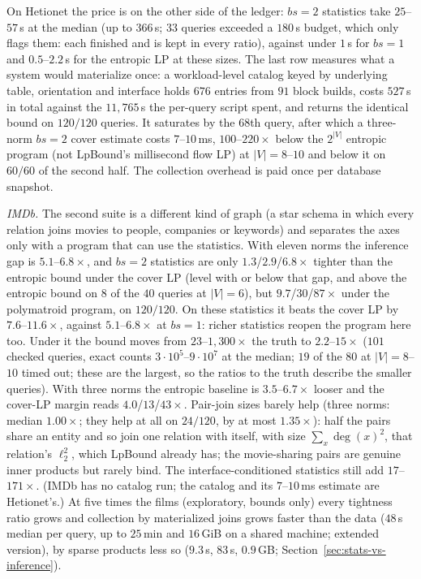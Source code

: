 \documentclass[sigconf, nonacm, acmthm=false]{acmart}
\begin{document}
On Hetionet the
price is on the other side of the ledger: $bs{=}2$ statistics take $25$--$57$\,s at the median (up to
$366$\,s; $33$ queries exceeded a $180$\,s budget, which only flags them:
each finished and is kept in every ratio), against under $1$\,s for $bs{=}1$ and $0.5$--$2.2$\,s for the
entropic LP at these sizes. The last row measures what a system would materialize once: a workload-level catalog keyed by underlying
table, orientation and interface holds $676$ entries from $91$ block
builds, costs $527$\,s in total against the $11{,}765$\,s the per-query
script spent, and returns the identical bound on $120/120$ queries. It
saturates by the $68$th query, after which a three-norm $bs{=}2$ cover estimate costs $7$--$10$\,ms, $100$--$220\times$ below the $2^{|V|}$ entropic program (not LpBound's millisecond flow LP)
at $|V|{=}8$--$10$ and below it on $60/60$ of the second half. The
collection overhead is paid once per database snapshot.

\emph{IMDb.} The second suite is a different kind of graph (a star
schema in which every relation joins movies to people, companies or
keywords) and separates the axes only with a program that can use the
statistics. With eleven norms the inference gap is $5.1$--$6.8\times$, and
$bs{=}2$ statistics are only $1.3$/$2.9$/$6.8\times$ tighter than the
entropic bound under the cover LP (level with or below that gap, and
above the entropic bound on $8$ of the $40$ queries at $|V|{=}6$), but
$9.7$/$30$/$87\times$ under the polymatroid program, on $120/120$. On
these statistics it beats the cover LP by $7.6$--$11.6\times$, against
$5.1$--$6.8\times$ at $bs{=}1$: richer statistics reopen the program here
too. Under it the bound moves from $23$--$1{,}300\times$ the
truth to $2.2$--$15\times$ ($101$ checked queries, exact counts
$3{\cdot}10^{5}$--$9{\cdot}10^{7}$ at the median; $19$ of the $80$ at
$|V|{=}8$--$10$ timed out; these are the largest, so the ratios to the
truth describe the smaller queries). With three norms the entropic baseline is
$3.5$--$6.7\times$ looser and the cover-LP margin reads
$4.0$/$13$/$43\times$. Pair-join sizes barely help (three norms: median
$1.00\times$; they help at all on $24/120$, by at most $1.35\times$): half
the pairs share an entity and so join one relation with itself, with
size $\sum_x \deg(x)^2$, that relation's $\ell_2^2$, which LpBound already
has; the movie-sharing pairs are genuine inner products but rarely bind.
The interface-conditioned statistics still add $17$--$171\times$. (IMDb
has no catalog run; the catalog and its $7$--$10$\,ms
estimate are Hetionet's.) At five times the films (exploratory, bounds only) every tightness ratio grows and collection by materialized joins grows faster than the data ($48$\,s median per query, up to $25$\,min and $16$\,GiB on a shared machine; extended version), by sparse products less so ($9.3$\,s, $83$\,s, $0.9$\,GB; Section~\ref{sec:stats-vs-inference}).
\end{document}
